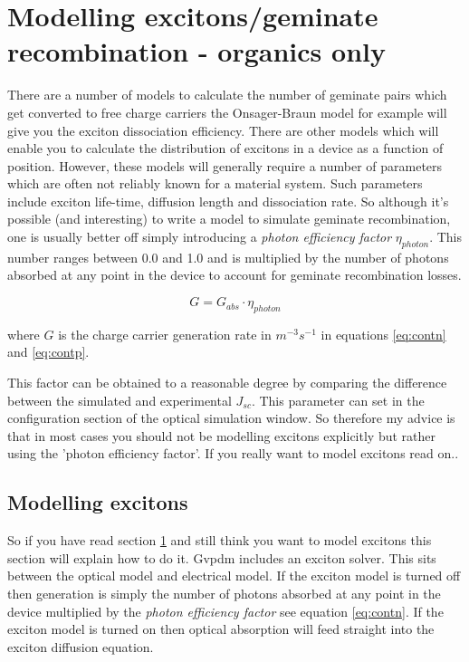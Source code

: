 \section{Modelling excitons/geminate recombination - organics only}
\label{sec:dont_do_excitions}
There are a number of models to calculate the number of geminate pairs which get converted to free charge carriers the Onsager-Braun model for example will give you the exciton dissociation efficiency.  There are other models which will enable you to calculate the distribution of excitons in a device as a function of position.  However, these models will generally require a number of parameters which are often not reliably known for a material system. Such parameters include exciton life-time, diffusion length and dissociation rate. So although it's possible (and interesting) to write a model to simulate geminate recombination, one is usually better off simply introducing a \emph{photon efficiency factor} $\eta_{photon}$. This number ranges between 0.0 and 1.0 and is multiplied by the number of photons absorbed at any point in the device to account for geminate recombination losses.

\begin{equation}
\label{eq:contn}
G=G_{abs}\cdot \eta_{photon}
\end{equation}

where $G$ is the charge carrier generation rate in $m^{-3}s^{-1}$ in equations \ref{eq:contn} and  \ref{eq:contp}.
 
This factor can be obtained to a reasonable degree by comparing the difference between the simulated and experimental $J_{sc}$.  This parameter can set in the configuration section of the optical simulation window. So therefore my advice is that in most cases you should not be modelling excitons explicitly but rather using the 'photon efficiency factor'. If you really want to model excitons read on..

\subsection{Modelling excitons}
\label{sec:excitions}
So if you have read section \ref{sec:dont_do_excitions} and still think you want to model excitons this section will explain how to do it.  Gvpdm includes an exciton solver. This sits between the optical model and electrical model.  If the exciton model is turned off then generation is simply the number of photons absorbed at any point in the device multiplied by the \emph{photon efficiency factor} see equation \ref{eq:contn}. If the exciton model is turned on then optical absorption will feed straight into the exciton diffusion equation.

